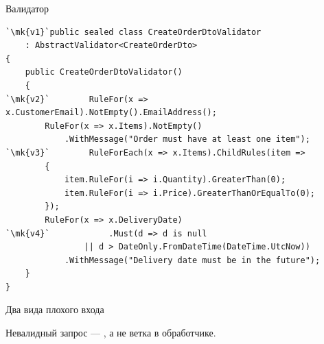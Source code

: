 \documentclass[aspectratio=169,10pt,t]{beamer}
\newcommand{\codexs}{\ttfamily\fontsize{7.0}{8.3}\selectfont}
\newcommand{\mk}[1]{\tikz[remember picture,overlay]\coordinate (#1) at (0,0.55ex);}
\begin{document}
\begin{frame}[fragile]{Валидатор}
  \vspace{0.3em}
\begin{lstlisting}[style=csharp,basicstyle=\codexs,escapechar=`]
`\mk{v1}`public sealed class CreateOrderDtoValidator
    : AbstractValidator<CreateOrderDto>
{
    public CreateOrderDtoValidator()
    {
`\mk{v2}`        RuleFor(x => x.CustomerEmail).NotEmpty().EmailAddress();
        RuleFor(x => x.Items).NotEmpty()
            .WithMessage("Order must have at least one item");
`\mk{v3}`        RuleForEach(x => x.Items).ChildRules(item =>
        {
            item.RuleFor(i => i.Quantity).GreaterThan(0);
            item.RuleFor(i => i.Price).GreaterThanOrEqualTo(0);
        });
        RuleFor(x => x.DeliveryDate)
`\mk{v4}`            .Must(d => d is null
                || d > DateOnly.FromDateTime(DateTime.UtcNow))
            .WithMessage("Delivery date must be in the future");
    }
}
\end{lstlisting}
\end{frame}

\begin{frame}[plain]
\end{frame}

\begin{frame}{Два вида плохого входа}
  \slidetop

  \slidegap
  {\large Невалидный запрос --- , а не ветка в обработчике.}
\end{frame}
\end{document}
